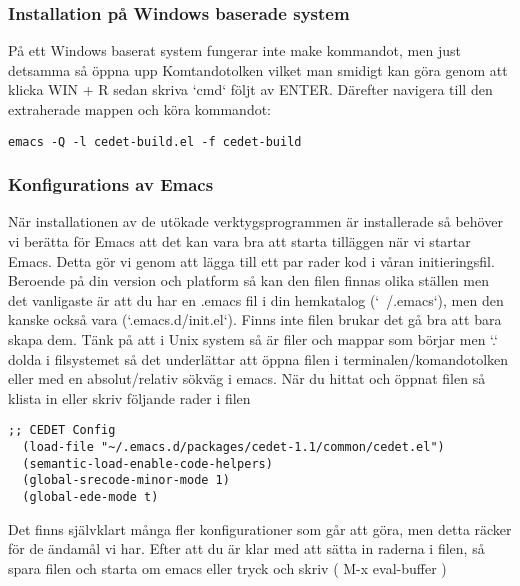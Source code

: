 \documentclass[12pt]{article} %
\begin{document}

\subsubsection{Installation på Windows baserade system}
På ett Windows baserat system fungerar inte make kommandot, men just detsamma så öppna upp Komtandotolken vilket man smidigt kan göra genom att klicka WIN + R sedan skriva `cmd` följt av ENTER. Därefter navigera till den extraherade mappen och köra kommandot:
\begin{lstlisting}
emacs -Q -l cedet-build.el -f cedet-build 
\end{lstlisting}





\subsubsection{Konfigurations av Emacs} %
När installationen av de utökade verktygsprogrammen är installerade så behöver vi berätta för Emacs att det kan vara bra att starta tilläggen när vi startar Emacs. Detta gör vi genom att lägga till ett par rader kod i våran initieringsfil. Beroende på din version och platform så kan den filen finnas olika ställen men det vanligaste är att du har en .emacs fil i din hemkatalog (`~/.emacs`), men den kanske också vara (`.emacs.d/init.el`). Finns inte filen brukar det gå bra att bara skapa dem.  Tänk på att i Unix system så är filer och mappar som börjar men `.` dolda i filsystemet så det underlättar att öppna filen i terminalen/komandotolken eller med en absolut/relativ sökväg i emacs. 
När du hittat och öppnat filen så klista in eller skriv följande rader i filen
\begin{lstlisting}
;; CEDET Config
  (load-file "~/.emacs.d/packages/cedet-1.1/common/cedet.el")
  (semantic-load-enable-code-helpers) 
  (global-srecode-minor-mode 1)       
  (global-ede-mode t)
\end{lstlisting}

Det finns självklart många fler konfigurationer som går att göra, men detta räcker för de ändamål vi har. Efter att du är klar med att sätta in raderna i filen, så spara filen och starta om emacs eller tryck och skriv  ( M-x eval-buffer ) 
\newpage
\end{document}
